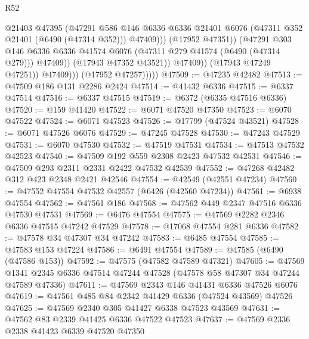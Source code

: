\begin{lexlean}{R52}
\begin{coremodule}
                                  @21403
                                  @47395
                                  (@47291
                                    @586
                                    @146
                                    @6336
                                    @6336
                                    @21401
                                    @6076
                                    (@47311 @352 @21401 (@6490 (@47314 @352)))
                                    @47409)))
                              (@17952 @47351))
                            (@47291
                              @303
                              @146
                              @6336
                              @6336
                              @41574
                              @6076
                              (@47311 @279 @41574 (@6490 (@47314 @279)))
                              @47409))
                          (@17943 @47352 @43521))
                        @47409))
                    (@17943 @47249 @47251))
                  @47409)))
            (@17952 @47257)))))
@47509 := @47235 @42482
@47513 := @47509 @186 @131 @2286 @2424
@47514 := @41432 @6336
@47515 := @6337 @47514
@47516 := @6337 @47515
@47519 := @6372 (@6335 @47516 @6336)
@47520 := @159 @41420
@47522 := @6071 @47520 @47350
@47523 := @6070 @47522
@47524 := @6071 @47523
@47526 := @17799 (@47524 @43521)
@47528 := @6071 @47526 @6076
@47529 := @47245 @47528
@47530 := @47243 @47529
@47531 := @6070 @47530
@47532 := @47519 @47531
@47534 := @47513 @47532 @42523
@47540 := @47509 @192 @559 @2308 @2423 @47532 @42531
@47546 := @47509 @293 @2311 @2331 @2422 @47532 @42539
@47552 := @47268 @42482 @312 @423 @2348 @2421 @42546
@47554 := @42549 (@42551 @47234)
@47560 := @47552 @47554 @47532 @42557 (@6426 (@42560 @47234))
@47561 := @6938 @47554
@47562 := @47561 @186
@47568 := @47562 @449 @2347 @47516 @6336 @47530 @47531
@47569 := @6476 @47554
@47575 := @47569 @2282 @2346 @6336 @47515 @47242 @47529
@47578 := @17068 @47554 @281 @6336
@47582 := @47578 @34 @47307 @34 @47242
@47583 := @6485 @47554
@47585 := @47583 @153 @47224
@47586 := @6491 @47554
@47589 := @47585 (@6490 (@47586 @153))
@47592 := @47575 (@47582 @47589 @47321)
@47605 := @47569 @1341 @2345 @6336 @47514 @47244 @47528 (@47578 @58 @47307 @34 @47244 @47589 @47336)
@47611 := @47569 @2343 @146 @41431 @6336 @47526 @6076
@47619 := @47561 @485 @84 @2342 @41429 @6336 (@47524 @43569) @47526
@47625 := @47569 @2340 @305 @41427 @6338 @47523 @43569
@47631 := @47562 @83 @2339 @41425 @6336 @47522 @47523
@47637 := @47569 @2336 @2338 @41423 @6339 @47520 @47350

\end{coremodule}
\end{lexlean}
